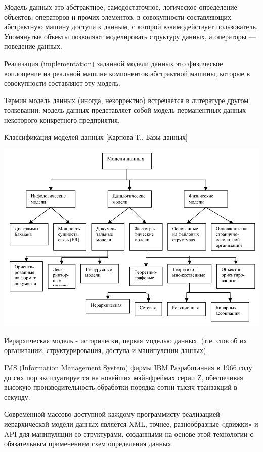 \documentclass{beamer}
\begin{document}
\begin{frame}
\begin{block}{Модель данных}
это абстрактное, самодостаточное, логическое определение объектов, операторов и прочих элементов, в совокупности составляющих абстрактную машину доступа к данным, с которой взаимодействует пользователь. Упомянутые объекты позволяют моделировать структуру данных, а операторы — поведение данных.
\end{block}
\begin{block}{Реализация (implementation) заданной модели данных}
это физическое воплощение на реальной машине компонентов абстрактной машины, которые в совокупности составляют эту модель.
\end{block}
Термин модель данных (иногда, некорректно) встречается в литературе другом толковании: модель данных представляет собой модель перманентных данных некоторого конкретного предприятия.
\end{frame}

\begin{frame}
\begin{block}{Классификация моделей данных [Карпова Т., Базы данных]}
\begin{center}
\includegraphics[scale=0.35]{images/shema-03.png}
\end{center}
\end{block}
\end{frame}

\begin{frame}
\begin{block}{Иерархическая модель}
- исторически, первая моделью данных, (т.е. способ их организации, структурирования, доступа и манипуляции данных).
\end{block}
IMS (Information Management System) фирмы IBM Разработанная в 1966 году до сих пор эксплуатируется на новейших мэйнфреймах серии Z, обеспечивая высокую производительность обработки порядка сотни тысяч транзакций в секунду.

Современной массово доступной каждому программисту реализацией иерархической модели данных является XML, точнее, разнообразные «движки» и API для манипуляции со структурами, созданными на основе этой технологии с обязательным применением схем определения данных.
\end{frame}
\end{document}
